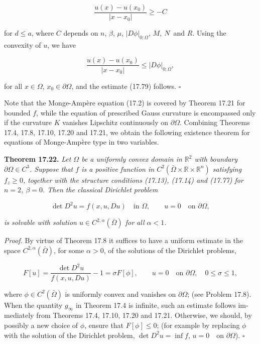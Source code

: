 \[
\frac{u(x) - u(x_0)}{|x - x_0|} \ge -C
\]

for $d \le a$, where $C$ depends on $n$, $\beta$, $\mu$, $|D\phi|_{0;\Omega}$, $M$, $N$ and $R$. Using the convexity of
$u$, we have

\[
\frac{u(x) - u(x_0)}{|x - x_0|} \le |D\phi|_{0;\Omega},
\]

for all $x \in \Omega$, $x_0 \in \partial\Omega$, and the estimate (17.79) follows. $\square$

Note that the Monge-Ampère equation (17.2) is covered by Theorem 17.21 for
bounded $f$, while the equation of prescribed Gauss curvature is encompassed only
if the curvature $K$ vanishes Lipschitz continuously on $\partial\Omega$. Combining Theorems
17.4, 17.8, 17.10, 17.20 and 17.21, we obtain the following existence theorem for
equations of Monge-Ampère type in two variables.

\textbf{Theorem 17.22.} \emph{Let $\Omega$ be a uniformly convex domain in $\mathbb R^2$ with boundary $\partial\Omega \in C^3$.
Suppose that $f$ is a positive function in $C^2(\bar\Omega \times \mathbb R \times \mathbb R^n)$ satisfying $f_z \ge 0$, together
with the structure conditions (17.13), (17.14) and (17.77) for $n = 2$, $\beta = 0$. Then the
classical Dirichlet problem}

\begin{equation}
\tag{17.80}
\det D^2u = f(x,u,Du) \quad \text{in } \Omega, \qquad u = 0 \quad \text{on } \partial\Omega,
\end{equation}

\emph{is solvable with solution $u \in C^{2,\alpha}(\bar\Omega)$ for all $\alpha < 1$.}

\emph{Proof.} By virtue of Theorem 17.8 it suffices to have a uniform estimate in the space
$C^{2,\alpha}(\bar\Omega)$, for some $\alpha > 0$, of the solutions of the Dirichlet problems,

\[
F[u] = \frac{\det D^2u}{f(x,u,Du)} - 1 = \sigma F[\phi], \qquad u = 0 \quad \text{on } \partial\Omega,\quad 0 \le \sigma \le 1,
\]

where $\phi \in C^2(\bar\Omega)$ is uniformly convex and vanishes on $\partial\Omega$; (see Problem 17.8).
When the quantity $g_\infty$ in Theorem 17.4 is infinite, such an estimate follows im-
mediately from Theorems 17.4, 17.10, 17.20 and 17.21. Otherwise, we should, by
possibly a new choice of $\phi$, ensure that $F[\phi] \le 0$; (for example by replacing $\phi$ with
the solution of the Dirichlet problem, $\det D^2u = \inf f$, $u = 0 \quad \text{on } \partial\Omega$). $\square$

